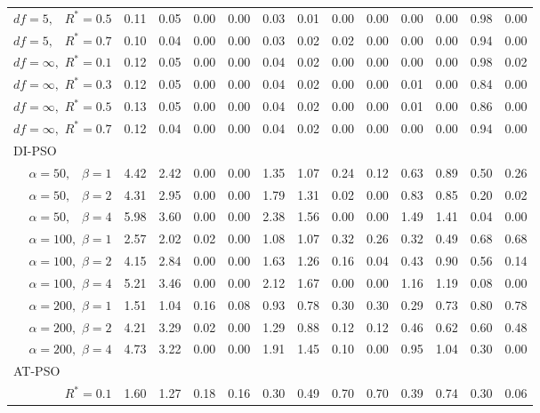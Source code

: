 \documentclass[12pt]{article}
\begin{document}
\begin{table}[ht]
{\begin{tabular}{r|rrrr|rrrr|rrrr}
  $df = 5,\enspace$ $R^* =0.5$ & 0.11 & 0.05 & 0.00 & 0.00 & 0.03 & 0.01 & 0.00 & 0.00 & 0.00 & 0.00 & 0.98 & 0.00 \\ 
  $df = 5,\enspace$ $R^* =0.7$ & 0.10 & 0.04 & 0.00 & 0.00 & 0.03 & 0.02 & 0.02 & 0.00 & 0.00 & 0.00 & 0.94 & 0.00 \\ 
  $df = \infty,$ $R^* =0.1$ & 0.12 & 0.05 & 0.00 & 0.00 & 0.04 & 0.02 & 0.00 & 0.00 & 0.00 & 0.00 & 0.98 & 0.02 \\ 
  $df = \infty,$ $R^* =0.3$ & 0.12 & 0.05 & 0.00 & 0.00 & 0.04 & 0.02 & 0.00 & 0.00 & 0.01 & 0.00 & 0.84 & 0.00 \\ 
  $df = \infty,$ $R^* =0.5$ & 0.13 & 0.05 & 0.00 & 0.00 & 0.04 & 0.02 & 0.00 & 0.00 & 0.01 & 0.00 & 0.86 & 0.00 \\ 
  $df = \infty,$ $R^* =0.7$ & 0.12 & 0.04 & 0.00 & 0.00 & 0.04 & 0.02 & 0.00 & 0.00 & 0.00 & 0.00 & 0.94 & 0.00 \\ 
\hline
\multicolumn{1}{l|}{DI-PSO} &&&&&&&&&&&&\\
  $\alpha = 50,\enspace$ $\beta =1$ & 4.42 & 2.42 & 0.00 & 0.00 & 1.35 & 1.07 & 0.24 & 0.12 & 0.63 & 0.89 & 0.50 & 0.26 \\ 
  $\alpha = 50,\enspace$ $\beta =2$ & 4.31 & 2.95 & 0.00 & 0.00 & 1.79 & 1.31 & 0.02 & 0.00 & 0.83 & 0.85 & 0.20 & 0.02 \\ 
  $\alpha = 50,\enspace$ $\beta =4$ & 5.98 & 3.60 & 0.00 & 0.00 & 2.38 & 1.56 & 0.00 & 0.00 & 1.49 & 1.41 & 0.04 & 0.00 \\ 
  $\alpha = 100,$ $\beta =1$ & 2.57 & 2.02 & 0.02 & 0.00 & 1.08 & 1.07 & 0.32 & 0.26 & 0.32 & 0.49 & 0.68 & 0.68 \\ 
  $\alpha = 100,$ $\beta =2$ & 4.15 & 2.84 & 0.00 & 0.00 & 1.63 & 1.26 & 0.16 & 0.04 & 0.43 & 0.90 & 0.56 & 0.14 \\ 
  $\alpha = 100,$ $\beta =4$ & 5.21 & 3.46 & 0.00 & 0.00 & 2.12 & 1.67 & 0.00 & 0.00 & 1.16 & 1.19 & 0.08 & 0.00 \\ 
  $\alpha = 200,$ $\beta =1$ & 1.51 & 1.04 & 0.16 & 0.08 & 0.93 & 0.78 & 0.30 & 0.30 & 0.29 & 0.73 & 0.80 & 0.78 \\ 
  $\alpha = 200,$ $\beta =2$ & 4.21 & 3.29 & 0.02 & 0.00 & 1.29 & 0.88 & 0.12 & 0.12 & 0.46 & 0.62 & 0.60 & 0.48 \\ 
  $\alpha = 200,$ $\beta =4$ & 4.73 & 3.22 & 0.00 & 0.00 & 1.91 & 1.45 & 0.10 & 0.00 & 0.95 & 1.04 & 0.30 & 0.00 \\ 
\hline
\multicolumn{1}{l|}{AT-PSO} &&&&&&&&&&&&\\
  $R^* = 0.1$ & 1.60 & 1.27 & 0.18 & 0.16 & 0.30 & 0.49 & 0.70 & 0.70 & 0.39 & 0.74 & 0.30 & 0.06 \\ 

\end{tabular}}
\end{table}
\end{document}
